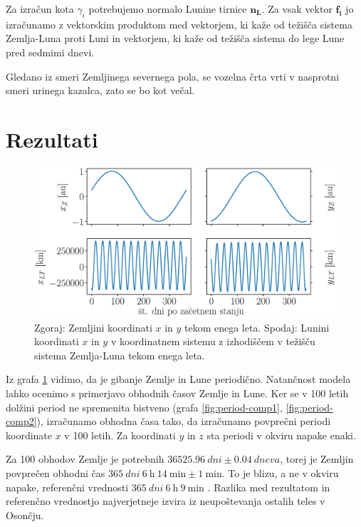 \documentclass[a4paper,12pt]{article}
\renewcommand{\vec}[1]{\mathbf{#1}} %
\begin{document}
\noindent
Za izračun kota $\gamma_i$ potrebujemo normalo Lunine tirnice $\vec{n_L}$. Za
vsak vektor $\vec{f_i}$ jo izračunamo z vektorskim produktom med vektorjem,
ki kaže od težišča sistema Zemlja-Luna proti Luni in vektorjem, ki kaže od 
težišča sistema do lege Lune pred sedmimi dnevi.

Gledano iz smeri Zemljinega severnega pola, se vozelna črta vrti v nasprotni 
smeri urinega kazalca, zato se bo kot večal.

\newpage
\section{Rezultati}

\renewcommand{\figurename}{Graf}

\begin{figure}[ht!]
    \centering
    \includegraphics[scale=0.46]{slikep/koordinate.eps}
    \caption{Zgoraj: Zemljini koordinati $x$ in $y$ tekom enega leta. Spodaj: 
    Lunini koordinati $x$ in $y$ v koordinatnem sistemu z izhodiščem v težišču 
    sistema Zemlja-Luna tekom enega leta.}
    \label{fig:koordxy}
\end{figure}

\noindent
Iz grafa \ref{fig:koordxy} vidimo, da je gibanje Zemlje in Lune periodično.
Natančnost modela lahko ocenimo s primerjavo obhodnih časov Zemlje in Lune.
Ker se v 100 letih dolžini period ne spremenita bistveno (grafa 
\ref{fig:period-comp1}, \ref{fig:period-comp2}), izračunamo obhodna časa tako, 
da izračunamo povprečni periodi koordinate $x$ v 100 letih. Za koordinati $y$ 
in $z$ sta periodi v okviru napake enaki.

Za 100 obhodov Zemlje je potrebnih $\SI{36525.96}{dni}\pm\SI{0.04}{dneva}$, 
torej je Zemljin povprečen obhodni čas
$\SI{365}{dni}\ \SI{6}{\hour}\ \SI{14}{\minute}\pm\SI{1}{\minute}$. To je blizu,
a ne v okviru napake, referenčni vrednosti 
$\SI{365}{dni}\ \SI{6}{\hour}\ \SI{9}{\minute}$ \cite{nasassd}. Razlika med 
rezultatom in referenčno vrednostjo najverjetneje izvira iz neupoštevanja 
ostalih teles v Osončju.
\end{document}
